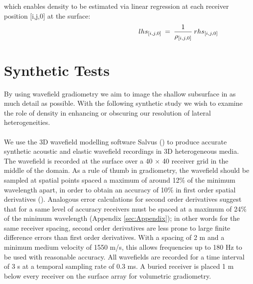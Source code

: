 \documentclass{article}
\begin{document}
	which enables density to be estimated via linear regression at each receiver position [i,j,0] at the surface:
	\begin{align} \shoveright \shoveright \shoveright \shoveright \shoveright \shoveright \shoveright \shoveright \shoveright \shoveright \shoveright \shoveright \shoveright \shoveright 
		\shoveright \shoveright 
		lhs_{[i,j,0]} \:&=\: \frac{1}{\rho_{[i,j,0]}}   \: rhs_{[i,j,0]}
		\label{eq:FS_RHO_linREG}   
	\end{align}
	
	
	\section{Synthetic Tests} \label{sec:synstudie}
	By using wavefield gradiometry we aim to image the shallow subsurface in as much detail as possible. With the following synthetic study we wish to examine the role of density in enhancing or obscuring our resolution of lateral heterogeneities.\\ \\
	We use the 3D wavefield modelling software Salvus (\cite{afanasiev2019modular}) to produce accurate synthetic acoustic and elastic wavefield recordings in 3D heterogeneous media. The wavefield is recorded at the surface over a 40 $\times$ 40 receiver grid in the middle of the domain. As a rule of thumb in gradiometry, the wavefield should be sampled at spatial points spaced a maximum of around 12$\%$ of the minimum wavelength apart, in order to obtain an accuracy of 10$\%$ in first order spatial derivatives (\cite{Langston1}). Analogous error calculations for second order derivatives suggest that for a same level of accuracy receivers must be spaced at a maximum of 24$\%$ of the minimum wavelength (Appendix \ref{sec:Appendix}); in other words for the same receiver spacing, second order derivatives are less prone to large finite difference errors than first order derivatives. With a spacing of 2 m and a minimum medium velocity of 1550 m/s, this allows frequencies up to 180 Hz to be used with reasonable accuracy. All wavefields are recorded for a time interval of 3 s at a temporal sampling rate of 0.3 ms. A buried receiver is placed 1 m below every receiver on the surface array for volumetric gradiometry.
	
\end{document}
